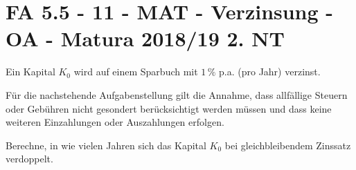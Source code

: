\section{FA 5.5 - 11 - MAT - Verzinsung - OA - Matura 2018/19 2. NT}

\begin{beispiel}[FA 5.5]{1}
Ein Kapital $K_0$ wird auf einem Sparbuch mit $1\,\%$ p.a. (pro Jahr) verzinst.

Für die nachstehende Aufgabenstellung gilt die Annahme, dass allfällige Steuern oder Gebühren nicht gesondert berücksichtigt werden müssen und dass keine weiteren Einzahlungen oder Auszahlungen erfolgen.

Berechne, in wie vielen Jahren sich das Kapital $K_0$ bei gleichbleibendem Zinssatz verdoppelt.

\end{beispiel}